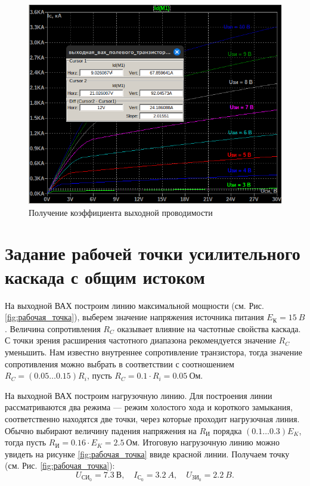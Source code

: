 \begin{figure}[H]
    \centering
    \includegraphics[width=0.8\linewidth]{figs/получение_G.png}
    \caption{Получение коэффициента выходной проводимости}
    \label{fig:коэффициент_выходной_проводимости}
\end{figure}



\section*{Задание рабочей точки усилительного каскада с общим
истоком}

На выходной ВАХ построим линию максимальной мощности (см. Рис. \ref{fig:рабочая_точка}),
выберем значение напряжения источника питания $E_\text{К}=15\ B$.
Величина сопротивления $R_C$ оказывает влияние на частотные
свойства каскада. С точки зрения расширения частотного
диапазона рекомендуется значение $R_C$ уменьшить. Нам известно 
внутреннее сопротивление транзистора, тогда значение сопротивления можно выбрать в
соответствии с соотношением $R_C=(0.05\dots 0.15)R_i$, пусть $R_C=0.1\cdot R_i=0.05\ \text{Ом}$. 

На выходной ВАХ построим нагрузочную линию. Для построения
линии рассматриваются два режима --- режим холостого
хода и короткого замыкания, соответственно находятся две
точки, через которые проходит нагрузочная линия. Обычно
выбирают величину падения напряжения на $R_\text{И}$ порядка $(0.1\dots 0.3)E_K$,
тогда пусть $R_\text{И}=0.16\cdot E_K=2.5\ \text{Ом}$. Итоговую нагрузочную линию
можно увидеть на рисунке \ref{fig:рабочая_точка} ввиде красной линии. 
Получаем точку (см. Рис. \ref{fig:рабочая_точка}):
\begin{equation*}
    U_{\text{СИ}_0}=7.3\ \text{В},\quad I_{\text{С}_0}=3.2\ A,\quad U_{\text{ЗИ}_0}=2.2\ B.
\end{equation*}

